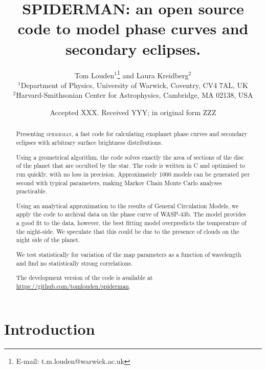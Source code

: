 \documentclass[a4paper,fleqn,usenatbib]{mnras}
\title[SPIDERMAN]{SPIDERMAN: an open source code to model phase curves and secondary eclipses.}
\author[T. Louden, L. Kreidberg]{Tom Louden$^{1}$\thanks{E-mail: t.m.louden@warwick.ac.uk} and Laura Kreidberg$^{2}$\\
$^{1}$Department of Physics, University of Warwick, Coventry, CV4 7AL, UK\\
$^{2}$Harvard-Smithsonian Center for Astrophysics, Cambridge, MA 02138, USA}
\date{Accepted XXX. Received YYY; in original form ZZZ}
\begin{document}
\label{firstpage}
\pagerange{\pageref{firstpage}--\pageref{lastpage}}
\maketitle

\begin{abstract}

Presenting \textsc{spiderman}, a fast code for calculating exoplanet phase curves and secondary eclipses with arbitrary surface brightness distributions.

Using a geometrical algorithm, the code solves exactly the area of sections of the disc of the planet that are occulted by the star. The code is written in C and optimised to run quickly, with no loss in precision. Approximately 1000 models can be generated per second with typical parameters, making Markov Chain Monte Carlo analyses practicable. 

Using an analytical approximation to the results of General Circulation Models, we apply the code to archival data on the phase curve of WASP-43b. The model provides a good fit to the data, however, the best fitting model overpredicts the temperature of the night-side. We speculate that this could be due to the presence of clouds on the night side of the planet.

We test statistically for variation of the map parameters as a function of wavelength and find no statistically strong correlations.

The development version of the code is available at \url{https://github.com/tomlouden/spiderman}.

\end{abstract}

\begin{keywords}
\end{keywords}



\section{Introduction}\label{sec:introduction}
\end{document}
